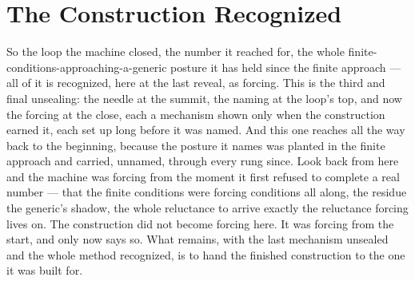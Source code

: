 \section{The Construction Recognized}

So the loop the machine closed, the number it reached for, the whole finite-conditions-approaching-a-generic
posture it has held since the finite approach --- all of it is recognized, here at the last reveal, as forcing.
This is the third and final unsealing: the needle at the summit, the naming at the loop's top, and now the
forcing at the close, each a mechanism shown only when the construction earned it, each set up long before it was
named. And this one reaches all the way back to the beginning, because the posture it names was planted in the
finite approach and carried, unnamed, through every rung since. Look back from here and the machine was forcing
from the moment it first refused to complete a real number --- that the finite conditions were forcing conditions
all along, the residue the generic's shadow, the whole reluctance to arrive exactly the reluctance forcing lives
on. The construction did not become forcing here. It was forcing from the start, and only now says so. What
remains, with the last mechanism unsealed and the whole method recognized, is to hand the finished construction
to the one it was built for.
